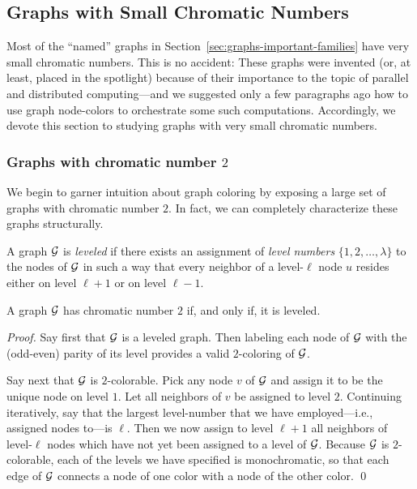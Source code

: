 \subsection{Graphs with Small Chromatic Numbers}
\label{sec:Graphs-small-Chromatic-No} 

Most of the ``named'' graphs in
Section~\ref{sec:graphs-important-families} have very small chromatic
numbers.  This is no accident: These graphs were invented (or, at
least, placed in the spotlight) because of their importance to the
topic of parallel and distributed computing---and we suggested only a
few paragraphs ago how to use graph node-colors to orchestrate some
such computations.  Accordingly, we devote this section to studying
graphs with very small chromatic numbers.

\subsubsection{Graphs with chromatic number $2$}
\label{sec:2-color-graphs}

We begin to garner intuition about graph coloring by exposing a large
set of graphs with chromatic number $2$.  In fact, we can completely
characterize these graphs structurally.

A graph $\mbox{$\cal G$}$ is {\it leveled}  if there exists
an assignment of {\it level numbers} $\{ 1, 2, \ldots, \lambda\}$ to the
nodes of $\mbox{$\cal G$}$ in such a way that every neighbor of a level-$\ell$ node
$u$ resides either on level $\ell +1$ or on level $\ell -1$.

\begin{prop}
\label{thm:leveled=2-color}
A graph $\mbox{$\cal G$}$ has chromatic number $2$ if, and only if, it is leveled.
\end{prop}

\begin{proof}
Say first that $\mbox{$\cal G$}$ is a leveled graph.  Then labeling each node of
$\mbox{$\cal G$}$ with the (odd-even) parity of its level provides a valid
$2$-coloring of $\mbox{$\cal G$}$.

Say next that $\mbox{$\cal G$}$ is $2$-colorable.  Pick any node $v$ of $\mbox{$\cal G$}$ and
assign it to be the unique node on level $1$.  Let all neighbors of
$v$ be assigned to level $2$.  Continuing iteratively, say that the
largest level-number that we have employed---i.e., assigned nodes
to---is $\ell$.  Then we now assign to level $\ell +1$ all neighbors
of level-$\ell$ nodes which have not yet been assigned to a level of
$\mbox{$\cal G$}$.  Because $\mbox{$\cal G$}$ is $2$-colorable, each of the levels we have
specified is monochromatic, so that each edge of $\mbox{$\cal G$}$ connects a node
of one color with a node of the other color.  \qed
\end{proof}

